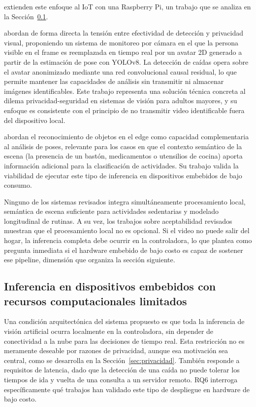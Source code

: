\textcite{Ali2025} extienden este enfoque al IoT con una Raspberry Pi, un trabajo que se analiza en la Sección~\ref{sec:edge-inference}.

\textcite{Wang2024} abordan de forma directa la tensión entre efectividad de detección y privacidad visual, proponiendo un sistema de monitoreo por cámara en el que la persona visible en el frame es reemplazada en tiempo real por un avatar 2D generado a partir de la estimación de pose con YOLOv8. La detección de caídas opera sobre el avatar anonimizado mediante una red convolucional causal residual, lo que permite mantener las capacidades de análisis sin transmitir ni almacenar imágenes identificables. Este trabajo representa una solución técnica concreta al dilema privacidad-seguridad en sistemas de visión para adultos mayores, y su enfoque es consistente con el principio de no transmitir video identificable fuera del dispositivo local.

\textcite{Surantha2025} abordan el reconocimiento de objetos en el edge como capacidad complementaria al análisis de poses, relevante para los casos en que el contexto semántico de la escena (la presencia de un bastón, medicamentos o utensilios de cocina) aporta información adicional para la clasificación de actividades. Su trabajo valida la viabilidad de ejecutar este tipo de inferencia en dispositivos embebidos de bajo consumo.

Ninguno de los sistemas revisados integra simultáneamente procesamiento local, semántica de escena suficiente para actividades sedentarias y modelado longitudinal de rutinas.
A su vez, los trabajos sobre aceptabilidad revisados muestran que el procesamiento local no es opcional.
Si el video no puede salir del hogar, la inferencia completa debe ocurrir en la controladora, lo que plantea como pregunta inmediata si el hardware embebido de bajo costo es capaz de sostener ese pipeline, dimensión que organiza la sección siguiente.

\subsection{Inferencia en dispositivos embebidos con recursos computacionales limitados}
\label{sec:edge-inference}

Una condición arquitectónica del sistema propuesto es que toda la inferencia de visión artificial ocurra localmente en la controladora, sin depender de conectividad a la nube para las decisiones de tiempo real.
Esta restricción no es meramente deseable por razones de privacidad, aunque esa motivación sea central, como se desarrolla en la Sección~\ref{sec:privacidad}.
También responde a requisitos de latencia, dado que la detección de una caída no puede tolerar los tiempos de ida y vuelta de una consulta a un servidor remoto.
RQ6 interroga específicamente qué trabajos han validado este tipo de despliegue en hardware de bajo costo.

